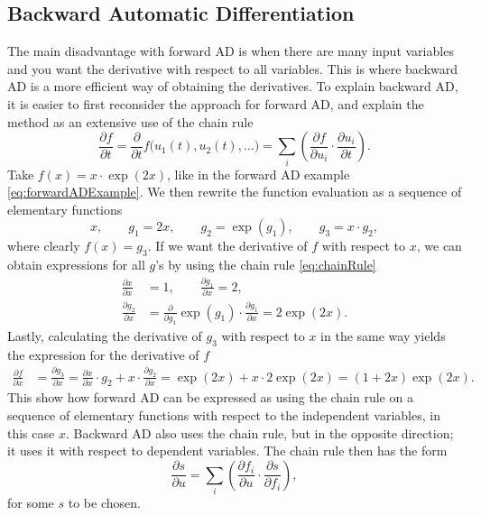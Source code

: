 \subsection{Backward Automatic Differentiation}
\label{sec:BackwardAD}
The main disadvantage with forward AD is when there are many input variables and you want the derivative with respect to all variables. This is where backward AD is a more efficient way of obtaining the derivatives. To explain backward AD, it is easier to first reconsider the approach for forward AD, and explain the method as an extensive use of the chain rule
\begin{equation}
    \label{eq:chainRule}
    \frac{\partial f}{\partial t} = 
    \frac{\partial}{\partial t}f\bigl(u_1(t),u_2(t),\dots\bigr)=
    \sum_i\left(\frac{\partial f}{\partial u_i}\cdot\frac{\partial u_i}{\partial t}\right).
\end{equation}
Take $f(x) = x\cdot\exp(2x)$, like in the forward AD example \eqref{eq:forwardADExample}. We then rewrite the function evaluation as a sequence of elementary functions
\begin{equation}
    \label{eq:BackwardADSeperationSimple}
    x, \hspace{2em} g_1 = 2x, \hspace{2em} g_2 = \exp(g_1), \hspace{2em} g_3 = x\cdot g_2,
\end{equation}
where clearly $f(x) = g_3$. If we want the derivative of $f$ with respect to $x$, we can obtain expressions for all $g$'s by using the chain rule \eqref{eq:chainRule}
\begin{align*}
     \frac{\partial x}{\partial x} &= 1, \qquad
     \frac{\partial g_1}{\partial x} = 2, \\
     \frac{\partial g_2}{\partial x} &= \frac{\partial}{\partial g_1}\exp(g_1)\cdot\frac{\partial g_1}{\partial x} = 2\exp(2x).
\end{align*}
Lastly, calculating the derivative of $g_3$ with respect to $x$ in the same way yields the expression for the derivative of $f$
\begin{align*}
    \frac{\partial f}{\partial x} &= \frac{\partial g_3}{\partial x}%
    =\frac{\partial x}{\partial x}\cdot g_2 + x\cdot\frac{\partial g_2}{\partial x}%
    = \exp(2x) + x\cdot 2\exp(2x)%
    = (1+2x)\exp(2x).
\end{align*}
This show how forward AD can be expressed as using the chain rule on a sequence of elementary functions with respect to the independent variables, in this case $x$. Backward AD also uses the chain rule, but in the opposite direction; it uses it with respect to dependent variables. The chain rule then has the form
\begin{equation}
    \label{eq:chainRuleReverse}
    \frac{\partial s}{\partial u} = \sum_i\left(\frac{\partial f_i}{\partial u}\cdot\frac{\partial s}{\partial f_i}\right),
\end{equation}
for some $s$ to be chosen.

